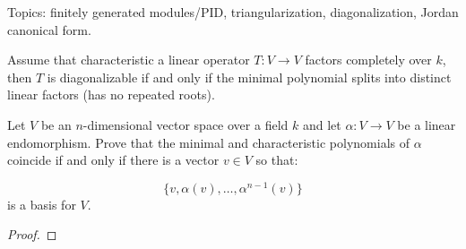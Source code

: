 Topics: finitely generated modules/PID, triangularization, diagonalization, Jordan canonical form.


\begin{prop}
    Assume that characteristic a linear operator $T:V\to V$ factors completely over $k$, then $T$ is diagonalizable if and only if the minimal polynomial splits into distinct linear factors (has no repeated roots).
\end{prop}


\begin{prob}[F2018-Q1]
    Let \( V \) be an \( n \)-dimensional vector space over a field \( k \) and let \( \alpha: V \to V \) be a linear endomorphism.  
Prove that the minimal and characteristic polynomials of \( \alpha \) coincide if and only if there is a vector \( v \in V \) so that:  

\[\{v, \alpha(v), \ldots, \alpha^{n-1}(v)\}\]
is a basis for \( V \).
\end{prob}
\begin{proof}
\end{proof}


